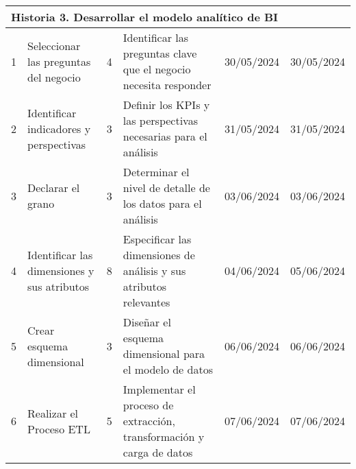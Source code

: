 \begin{longtable}{|p{0.5cm}|p{2cm}|p{1cm}|p{3cm}|p{1cm}|p{1cm}|}
    \multicolumn{6}{|l|}{\textbf{Historia 3. Desarrollar el modelo analítico de BI}}                                                                                                                                                                                                                                                                                                         \\ \hline
    1                                        & Seleccionar las preguntas del negocio                & 4                                                              & Identificar las preguntas clave que el negocio necesita responder               & 30/05/2024                                                    & 30/05/2024                                                          \\ \hline
    2                                        & Identificar indicadores y perspectivas               & 3                                                              & Definir los KPIs y las perspectivas necesarias para el análisis                 & 31/05/2024                                                    & 31/05/2024                                                          \\ \hline
    3                                        & Declarar el grano                                    & 3                                                              & Determinar el nivel de detalle de los datos para el análisis                    & 03/06/2024                                                    & 03/06/2024                                                          \\ \hline
    4                                        & Identificar las dimensiones y sus atributos          & 8                                                              & Especificar las dimensiones de análisis y sus atributos relevantes              & 04/06/2024                                                    & 05/06/2024                                                          \\ \hline
    5                                        & Crear esquema dimensional                            & 3                                                              & Diseñar el esquema dimensional para el modelo de datos                          & 06/06/2024                                                    & 06/06/2024                                                          \\ \hline
    6                                        & Realizar el Proceso ETL                              & 5                                                              & Implementar el proceso de extracción, transformación y carga de datos           & 07/06/2024                                                    & 07/06/2024                                                          \\ \hline

\end{longtable}
